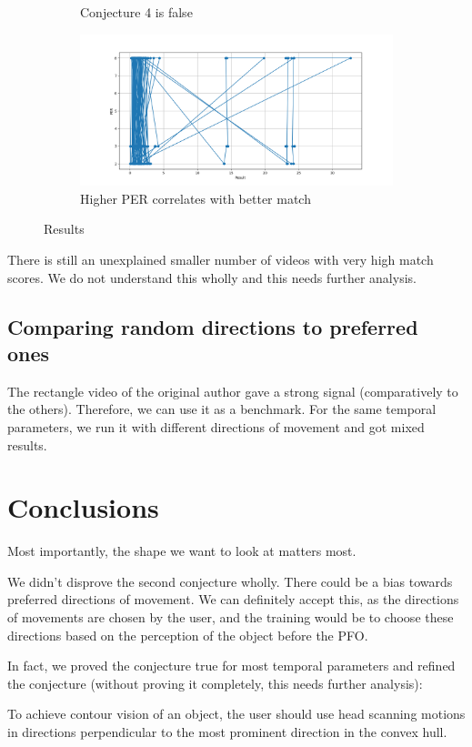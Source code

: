 \documentclass[]{article}
\begin{document}
\begin{figure}[h]
\begin{subfigure}{0.45\textwidth}
		\caption{Conjecture 4 is false}
		\label{graphs:conj4}
	\end{subfigure}
	\hfill
	\begin{subfigure}{0.45\textwidth}
		\centering
		\includegraphics[width=\textwidth]{QueryPER.png}
		\caption{Higher PER correlates with better match}
		\label{graphs:PER}
	\end{subfigure}
	\caption{Results}
	\label{fig:results_graphs}
\end{figure}
There is still an unexplained smaller number of videos with very high match scores. We do not understand this wholly and this needs further analysis. 

\subsection{Comparing random directions to preferred ones}
The rectangle video of the original author gave a strong signal (comparatively to the others). Therefore, we can use it as a benchmark. For the same temporal parameters, we run it with different directions of movement and got mixed results.
\section{Conclusions}
Most importantly, the shape we want to look at matters most. 

We didn't disprove the second conjecture wholly. There could be a bias towards preferred directions of movement. We can definitely accept this, as the directions of movements are chosen by the user, and the training would be to choose these directions based on the perception of the object before the PFO.

In fact, we proved the conjecture true for most temporal parameters and refined the conjecture (without proving it completely, this needs further analysis):

\begin{conjecture}
To achieve contour vision of an object, the user should use head scanning motions in directions perpendicular to the most prominent direction in the convex hull.
\end{conjecture}



\end{document}
